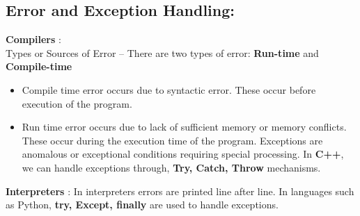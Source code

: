 \documentclass[english,a4paper,12pt]{article}
\begin{document}
\begin{enumerate}
\subsection*{\textbf{Error and Exception Handling}:}
    \textbullet \quad \textbf{Compilers} :\\
    Types or Sources of Error – There are two types of error: \textbf{Run-time} and \textbf{Compile-time}
    \begin{itemize}
  \item Compile time error occurs due to syntactic error. These occur before execution  of the program.
  \item Run time error occurs due to lack of sufficient memory or memory conflicts. These occur during the execution time of the program.
  \newpage
  Exceptions are anomalous or exceptional conditions requiring special processing.
  In \textbf{C++}, we can handle exceptions through, \textbf{Try, Catch, Throw} mechanisms.
\end{itemize}
 \textbullet \quad \textbf{Interpreters} : In interpreters errors are printed line after line. In languages such as Python, \textbf{try, Except, finally} are used to handle exceptions.

\end{enumerate}
\end{document}
